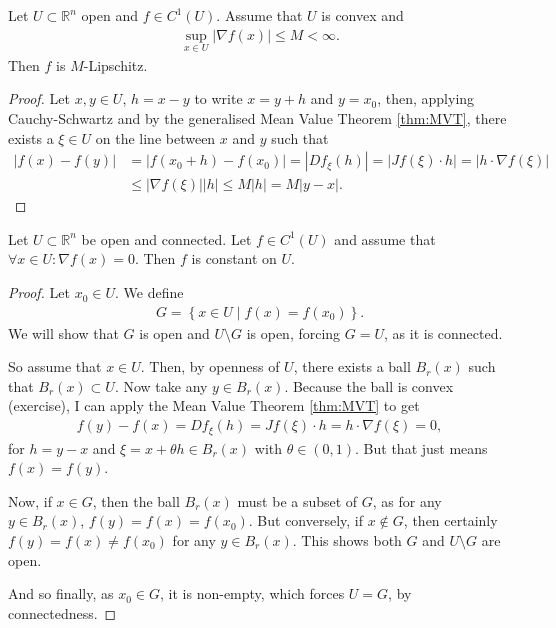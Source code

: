 \begin{prop}\label{prop:derivative-lipschitz}
	Let $U \subset \mathbb{R}^{n}$ open and $f \in C^{1}(U)$. Assume that $U$ is convex and
	\begin{align*}
		\sup_{x \in U} \left| \nabla f(x) \right| \leq M < \infty.
	\end{align*}
	Then $f$ is $M$-Lipschitz.
\end{prop}
\begin{proof}
	Let $x,y \in U$, $h = x-y$ to write $x = y+h$ and $y=x_{0}$, then, applying Cauchy-Schwartz and by the generalised Mean Value Theorem \ref{thm:MVT}, there exists a $\xi \in U$ on the line between $x$ and $y$ such that
	\begin{align*}
		|f(x) - f(y)| & = |f(x_{0} + h) - f(x_{0})| = |Df_{\xi}(h)| = |Jf(\xi) \cdot h| = |h \cdot \nabla f(\xi)|
		\\ &\leq \left| \nabla f(\xi) \right| \left| h \right| \leq M \left| h \right| = M \left| y-x \right|.
	\end{align*}
\end{proof}


\begin{theorem}\label{thm:}
	Let $U \subset \mathbb{R}^{n}$ be open and connected. Let $f \in C^{1}(U)$ and assume that $\forall x \in U: \nabla f(x) = 0$. Then $f$ is constant on $U$.
\end{theorem}
\begin{proof}
	Let $x_{0} \in U$. We define
	\begin{align*}
		G = \left\{ x \in U \mid f(x) = f(x_{0}) \right\}.
	\end{align*}
	We will show that $G$ is open and $U \setminus G$ is open, forcing $G = U$, as it is connected.

	So assume that $x \in U$. Then, by openness of $U$, there exists a ball $B_{r}(x)$ such that $B_{r}(x) \subset U$. Now take any $y \in B_{r}(x)$. Because the ball is convex (exercise), I can apply the Mean Value Theorem \ref{thm:MVT} to get
	\begin{align*}
		f(y) - f(x) = Df_{\xi}(h) = Jf(\xi) \cdot h = h \cdot \nabla f(\xi) = 0,
	\end{align*}
	for $h = y-x$ and $\xi = x + \theta h \in B_{r}(x)$ with $\theta \in (0,1)$. But that just means $f(x) = f(y)$.

	Now, if $x \in G$, then the ball $B_{r}(x)$ must be a subset of $G$, as for any $y \in B_{r}(x)$, $f(y) = f(x) = f(x_{0})$. But conversely, if $x \not  \in G$, then certainly $f(y) = f(x) \neq f(x_{0})$ for any $y \in B_{r}(x)$. This shows both $G$ and $U \setminus G$ are open.

	And so finally, as $x_{0} \in G$, it is non-empty, which forces $U = G$, by connectedness.
\end{proof}

